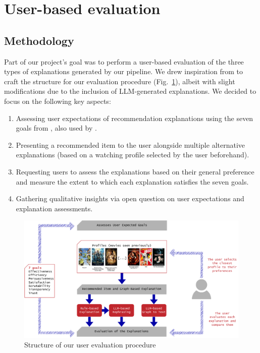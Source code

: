 \section{User-based evaluation} %

\subsection{Methodology}


Part of our project's goal was to perform a user-based evaluation of the three types of explanations generated by our pipeline. We drew inspiration from \cite{balog2020measuring} to craft the structure for our evaluation procedure (Fig.~\ref{fig:UserEvalStructure}), albeit with slight modifications due to the inclusion of LLM-generated explanations. We decided to focus on the following key aspects:
\begin{enumerate}
    \item Assessing user expectations of recommendation explanations using the seven goals from \cite{tintarev2015explaining}, also used by \cite{balog2020measuring}.
    \item Presenting a recommended item to the user alongside multiple alternative explanations (based on a watching profile selected by the user beforehand).
    \item Requesting users to assess the explanations based on their general preference and measure the extent to which each explanation satisfies the seven goals.
    \item Gathering qualitative insights via open question on user expectations and explanation assessments.
\end{enumerate}

\begin{figure}[!ht]
    \centering
    \includegraphics[width=\linewidth]{images/UserEval.pdf}
    \caption{Structure of our user evaluation procedure}
    \label{fig:UserEvalStructure}
\end{figure}

